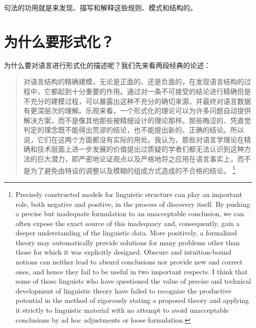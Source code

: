 句法的功用就是来发现、描写和解释这些规则、模式和结构的。

\section{为什么要形式化？}
\label{sec-formal}

为什么要对语言进行形式化的描述呢？我们先来看两段经典的论述：
\begin{quotation}
\label{quote-Chomsky-Formalisierung}%
对语言结构的精确建模，无论是正面的、还是负面的，在发现语言结构的过程中，它都起到十分重要的作用。通过对一条不可接受的结论进行精确但是不充分的建模过程，可以暴露出这种不充分的确切来源，并最终对语言数据有更深层次的理解。乐观来看，一个形式化的理论可以为许多问题自动提供解决方案，而不是像其他那些被精细设计的理论那样。那些晦涩的、凭直觉判定的理念既不能得出荒谬的结论，也不能提出新的、正确的结论。所以说，它们在这两个方面都没有实际的用处。我认为，那些对语言学理论在精确和技术层面上进一步发展的价值提出过质疑的学者们都无法认识到这种方法的巨大潜力，即严密地论证观点以及严格地将之应用在语言事实上，而不是为了避免由特设的调整以及模糊的组成方式造成的不合格的结论。
\citep[]{Chomsky57a}\footnote{%
Precisely constructed models for linguistic structure can play an
important role, both negative and positive, in the process of discovery 
itself. By pushing a precise but inadequate formulation to
an unacceptable conclusion, we can often expose the exact source
of this inadequacy and, consequently, gain a deeper understanding
of the linguistic data. More positively, a formalized theory may 
automatically provide solutions for many problems other than those
for which it was explicitly designed. Obscure and intuition-bound
notions can neither lead to absurd conclusions nor provide new and
correct ones, and hence they fail to be useful in two important respects. 
I think that some of those linguists who have questioned
the value of precise and technical development of linguistic theory
have failed to recognize the productive potential in the method
of rigorously stating a proposed theory and applying it strictly to
linguistic material with no attempt to avoid unacceptable conclusions 
by ad hoc adjustments or loose formulation.}
\end{quotation}

